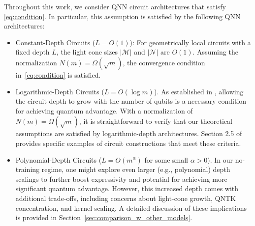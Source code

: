 \documentclass[pdflatex,sn-mathphys-num]{sn-jnl}%
\theoremstyle{thmstyleone}%
\theoremstyle{thmstyletwo}%
\theoremstyle{thmstylethree}%
\begin{document}
Throughout this work, we consider QNN circuit architectures that satisfy \eqref{eq:condition}.
In particular, this  assumption is satisfied by the following 
QNN architectures:
\begin{itemize}
\item Constant-Depth Circuits ($L=O(1)$): For geometrically local circuits with a fixed depth $L$, the light cone sizes $|\mathcal{M}|$ and $|\mathcal{N}|$ are $O(1)$. Assuming the normalization $N(m) = \Omega(\sqrt{m})$, the convergence condition in~\eqref{eq:condition} is satisfied.

\item Logarithmic-Depth Circuits ($L=O(\log m)$). As established in \cite{Girardi2025}, allowing the circuit depth to grow with the number of qubits is a necessary condition for achieving quantum advantage. With a normalization of $N(m) = \Omega(\sqrt{m})$, it is straightforward to verify that our theoretical assumptions are satisfied by logarithmic-depth architectures. Section 2.5 of \cite{Girardi2025} provides specific examples of circuit constructions that meet these criteria.

\item Polynomial-Depth Circuits ($L=O(m^{\alpha})$ for some small $\alpha>0$). 
In our no-training regime, one might explore even larger (e.g., polynomial) depth scalings to further boost expressivity and potential for achieving more significant quantum advantage. However, this increased depth comes with additional trade-offs, including concerns about light-cone growth, QNTK concentration, and kernel scaling. A detailed discussion of these implications is provided in Section~\ref{sec:comparison_w_other_models}.

\end{itemize}
\end{document}
